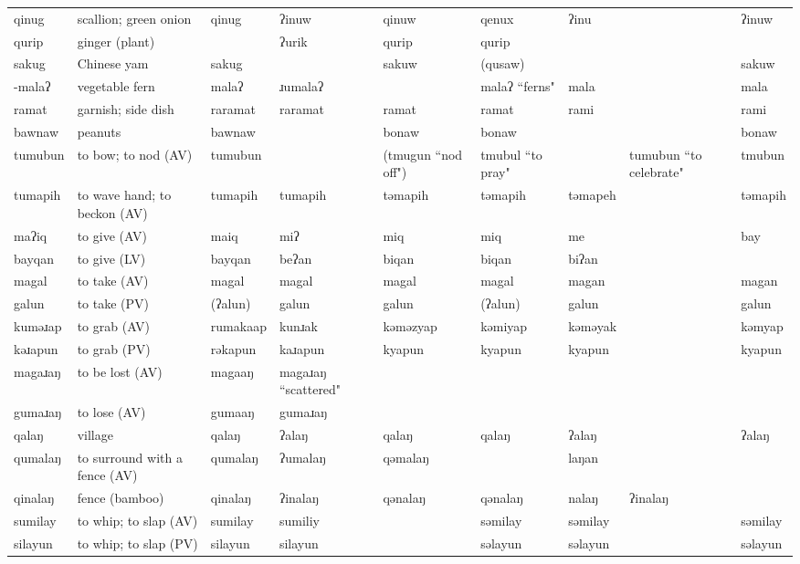 \begin{landscape}
\begin{longtable}{*{9}{>{\raggedright\arraybackslash}p{}}}
\text{*}qinug & scallion; green onion & qinug & ʔinuw & qinuw & qenux & ʔinu &  & ʔinuw\\
\text{*}qurip & ginger (plant) &  & ʔurik & qurip & qurip &  &  & \\
\text{*}sakug & Chinese yam & sakug &  & sakuw & (qusaw) &  &  & sakuw\\
\text{*}-malaʔ & vegetable fern & malaʔ & ɹumalaʔ &  & malaʔ ``ferns" & mala &  & mala\\
\text{*}ramat & garnish; side dish & raramat & raramat & ramat & ramat & rami &  & rami\\
\text{*}bawnaw & peanuts & bawnaw &  & bonaw & bonaw &  &  & bonaw\\
\text{*}tumubun & to bow; to nod (AV) & tumubun &  & (tmugun ``nod off") & tmubul ``to pray" &  & tumubun ``to celebrate" & tmubun\\
\text{*}tumapih & to wave hand; to beckon (AV) & tumapih & tumapih & təmapih & təmapih & təmapeh &  & təmapih\\
\text{*}maʔiq & to give (AV) & maiq & miʔ & miq & miq & me &  & bay\\
\text{*}bayqan & to give (LV) & bayqan & beʔan & biqan & biqan & biʔan &  & \\
\text{*}magal & to take (AV) & magal & magal & magal & magal & magan &  & magan\\
\text{*}galun & to take (PV) & (ʔalun) & galun & galun & (ʔalun) & galun &  & galun\\
\text{*}kuməɹap & to grab (AV) & rumakaap & kunɹak & kəməzyap & kəmiyap & kəməyak &  & kəmyap\\
\text{*}kəɹapun & to grab (PV) & rəkapun & kaɹapun & kyapun & kyapun & kyapun &  & kyapun\\
\text{*}magaɹaŋ & to be lost (AV) & magaaŋ & magaɹaŋ ``scattered" &  &  &  &  & \\
\text{*}gumaɹaŋ & to lose (AV) & gumaaŋ & gumaɹaŋ &  &  &  &  & \\
\text{*}qalaŋ & village & qalaŋ & ʔalaŋ & qalaŋ & qalaŋ & ʔalaŋ &  & ʔalaŋ\\
\text{*}qumalaŋ & to surround with a fence (AV) & qumalaŋ & ʔumalaŋ & qəmalaŋ &  & laŋan &  & \\
\text{*}qinalaŋ & fence (bamboo) & qinalaŋ & ʔinalaŋ & qənalaŋ & qənalaŋ & nalaŋ & ʔinalaŋ & \\
\text{*}sumilay & to whip; to slap (AV) & sumilay & sumiliy &  & səmilay & səmilay &  & səmilay\\
\text{*}silayun & to whip; to slap (PV) & silayun & silayun &  & səlayun & səlayun &  & səlayun\\

\end{longtable}
\end{landscape}
